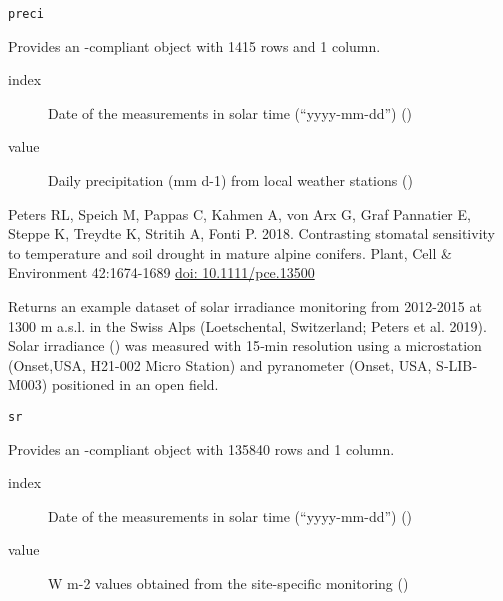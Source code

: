 \documentclass[a4paper]{book}
\begin{document}
%
\begin{Usage}
\begin{verbatim}
preci
\end{verbatim}
\end{Usage}
%
\begin{Format}
Provides an -compliant object with 1415 rows and 1 column.

\begin{description}

\item[index] Date of the measurements in solar time (“yyyy-mm-dd”) ()
\item[value] Daily precipitation (mm d-1) from local weather stations ()

\end{description}
\end{Format}
%
\begin{References}\relax
Peters RL, Speich M, Pappas C, Kahmen A, von Arx G, Graf Pannatier E, Steppe K, Treydte K, Stritih A, Fonti P. 2018.
Contrasting stomatal sensitivity to temperature and soil drought in mature alpine conifers.
Plant, Cell \& Environment 42:1674-1689 \url{doi: 10.1111/pce.13500}
\end{References}
%
\begin{Description}\relax
Returns an example dataset of solar irradiance monitoring from 2012-2015 at 1300 m a.s.l. in the Swiss Alps
(Loetschental, Switzerland; Peters et al. 2019). Solar irradiance () was measured with
15‐min resolution using a microstation (Onset,USA, H21-002 Micro Station)
and pyranometer (Onset, USA, S‐LIB‐M003) positioned in an open field.
\end{Description}
%
\begin{Usage}
\begin{verbatim}
sr
\end{verbatim}
\end{Usage}
%
\begin{Format}
Provides an -compliant object with 135840 rows and 1 column.

\begin{description}

\item[index] Date of the measurements in solar time (“yyyy-mm-dd”) ()
\item[value] W m-2 values obtained from the site-specific monitoring  ()

\end{description}
\end{Format}
\end{document}
